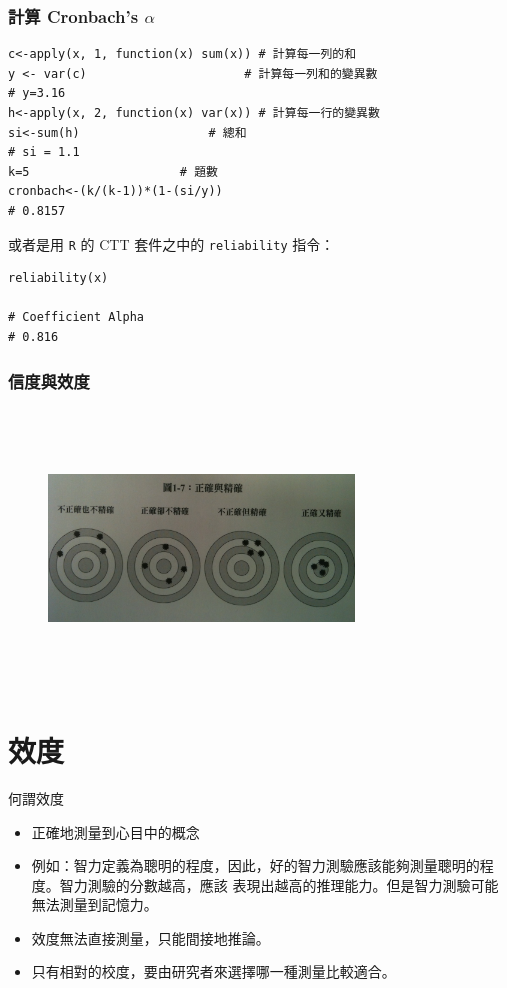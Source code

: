 \documentclass[xcolor=dvipsnames, 13pt]{beamer}
\begin{document}
\begin{frame}[fragile]\frametitle{計算 Cronbach's $\alpha$ }
\begin{Verbatim}[frame=single,label=\textit{R code}]
c<-apply(x, 1, function(x) sum(x)) # 計算每一列的和
y <- var(c) 					 # 計算每一列和的變異數
# y=3.16
h<-apply(x, 2, function(x) var(x)) # 計算每一行的變異數
si<-sum(h)					# 總和	
# si = 1.1
k=5						# 題數	
cronbach<-(k/(k-1))*(1-(si/y))   
# 0.8157
\end{Verbatim}
或者是用 \texttt{R} 的 CTT 套件之中的 \texttt{reliability} 指令：
\begin{Verbatim}[frame=single,label=\textit{R code}]
reliability(x)

# Coefficient Alpha 
# 0.816 
\end{Verbatim}
\end{frame}
\begin{frame}\frametitle{信度與效度}
\begin{figure}
\begin{center}
\includegraphics[width=3.2in,height=2.9in]{validityplot.png}
\end{center}
\end{figure}
\end{frame}
\section{效度}
\begin{frame}{何謂效度}
\begin{itemize}
\item 正確地測量到心目中的概念
\item 例如：智力定義為聰明的程度，因此，好的智力測驗應該能夠測量聰明的程度。智力測驗的分數越高，應該
表現出越高的推理能力。但是智力測驗可能無法測量到記憶力。
\item 效度無法直接測量，只能間接地推論。
\item 只有相對的校度，要由研究者來選擇哪一種測量比較適合。
\end{itemize}
\end{frame}
\end{document}
